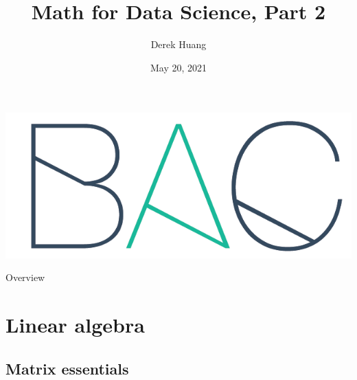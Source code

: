 \documentclass{beamer}
\title[Math for Data Science, Part 2]{Math for Data Science, Part 2}
\author[Derek Huang (BAC Advanced Team)]{Derek Huang}
\institute{BAC Advanced Team}
\date{May 20, 2021}
\numberwithin{equation}{section}
\begin{document}
\begin{frame}
    \titlepage
    \centering
    \includegraphics[scale = 0.1]{../bac_logo1.png}
\end{frame}

\begin{frame}{Overview}
    \tableofcontents
\end{frame}

\section{Linear algebra}

\subsection{Matrix essentials}
\end{document}

